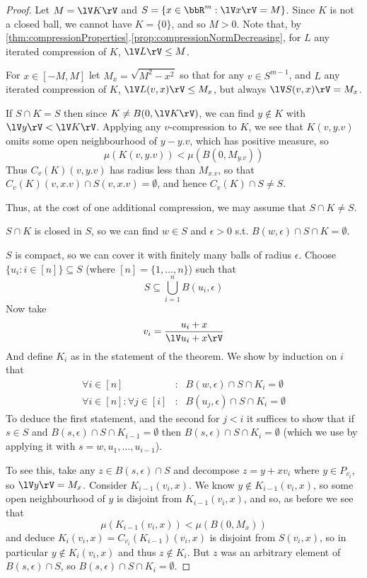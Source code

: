 \documentclass[a4paper,11pt]{article}
\begin{document}
\begin{proof}
Let $M=\lV K\rV$ and $S=\{x\in\bbR^m:\lV x\rV=M\}$.  Since $K$ is not a closed
ball, we cannot have $K=\{0\}$, and so $M>0$.  Note that, by
\ref{thm:compressionProperties}.\ref{prop:compressionNormDecreasing},
for $L$ any iterated compression of $K$, $\lV L\rV\leq M$.

For $x\in[-M,M]$ let $M_x=\sqrt{M^2-x^2}$ so
that for any $v\in S^{m-1}$, and $L$ any iterated
compression of $K$, $\lV L(v,x)\rV\leq M_x$, but always $\lV S(v,x)\rV=M_x$.

If $S\cap K=S$ then since
$K\not=B(0,\lV K\rV)$, we can find $y\not\in K$ with $\lV y\rV<\lV K\rV$.
Applying any $v$-compression to $K$, we see that $K(v,y.v)$ omits some open
neighbourhood of $y-y.v$, which has positive measure, so
\[
\mu(K(v,y.v))<\mu(B(0,M_{y.v}))
\]
Thus $C_v(K)(v,y.v)$ has radius less than $M_{x.v}$,
so that $C_v(K)(v,x.v)\cap S(v,x.v)=\emptyset$, and hence
$C_v(K)\cap S\not=S$.

Thus, at the cost of one additional compression, we may assume that
$S\cap K\not=S$.

$S\cap K$ is closed in $S$, so we can find $w\in S$ and $\epsilon>0$ s.t.
$B(w,\epsilon)\cap S\cap K=\emptyset$.

$S$ is compact, so we can cover it with finitely many balls of radius
$\epsilon$.  Choose $\{u_i:i\in[n]\}\subseteq S$ (where $[n]=\{1,\ldots,n\}$)
such that
\[
S\subseteq\bigcup_{i=1}^n B(u_i,\epsilon)
\]
Now take
\[
v_i=\frac{u_i+x}{\lV u_i+x\rV}
\]
And define $K_i$ as in the statement of the theorem.
We show by induction on $i$
that
%
\begin{eqnarray*}
\forall i\in[n] &:& B(w,\epsilon)\cap S\cap K_i=\emptyset \\
\forall i\in[n]:\forall j\in[i] &:& B(u_j,\epsilon)\cap S\cap K_i=\emptyset
\end{eqnarray*}
%
To deduce the first statement, and the second for $j<i$ it suffices to show
that if $s\in S$ and $B(s,\epsilon)\cap S\cap K_{i-1}=\emptyset$ then
$B(s,\epsilon)\cap S\cap K_i=\emptyset$ (which we use by applying it with
$s=w,u_1,\ldots,u_{i-1}$).

To see this, take any $z\in B(s,\epsilon)\cap S$ and decompose $z=y+xv_i$ where
$y\in P_{v_i}$, so $\lV y\rV=M_x$.  Consider $K_{i-1}(v_i,x)$.
We know $y\not\in K_{i-1}(v_i,x)$, so
some open neighbourhood of $y$ is disjoint from $K_{i-1}(v_i,x)$, and so, as
before we see that
\[
\mu(K_{i-1}(v_i,x))<\mu(B(0,M_x))
\]
and deduce $K_{i}(v_i,x)=C_{v_i}(K_{i-1})(v_i,x)$ is disjoint from $S(v_i,x)$,
so in particular $y\not\in K_{i}(v_i,x)$ and thus $z\not\in K_{i}$.  But $z$
was an arbitrary element of $B(s,\epsilon)\cap S$, so
$B(s,\epsilon)\cap S\cap K_{i}=\emptyset$.


\end{proof}
\end{document}
